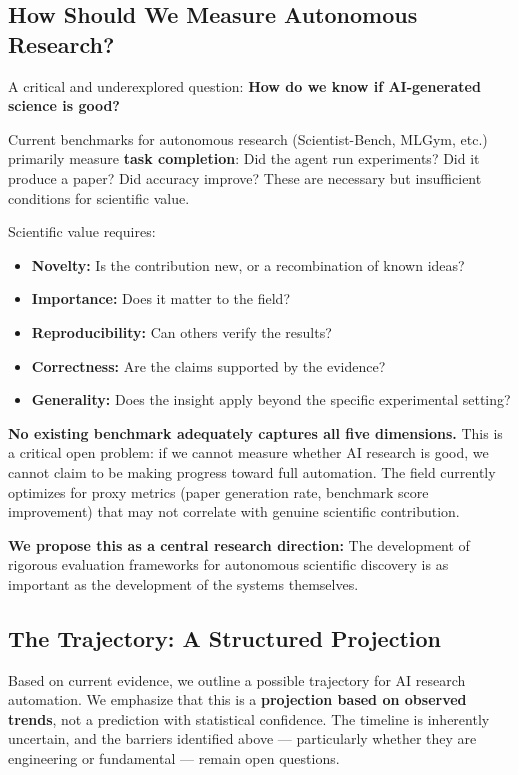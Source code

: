 \documentclass[11pt,a4paper]{article}
\begin{document}
\subsection{How Should We Measure Autonomous Research?}

A critical and underexplored question: \textbf{How do we know if AI-generated science is good?}

Current benchmarks for autonomous research (Scientist-Bench, MLGym, etc.) primarily measure \textbf{task completion}: Did the agent run experiments? Did it produce a paper? Did accuracy improve? These are necessary but insufficient conditions for scientific value.

Scientific value requires:
\begin{itemize}[leftmargin=2em]
    \item \textbf{Novelty:} Is the contribution new, or a recombination of known ideas?
    \item \textbf{Importance:} Does it matter to the field?
    \item \textbf{Reproducibility:} Can others verify the results?
    \item \textbf{Correctness:} Are the claims supported by the evidence?
    \item \textbf{Generality:} Does the insight apply beyond the specific experimental setting?
\end{itemize}

\textbf{No existing benchmark adequately captures all five dimensions.} This is a critical open problem: if we cannot measure whether AI research is good, we cannot claim to be making progress toward full automation. The field currently optimizes for proxy metrics (paper generation rate, benchmark score improvement) that may not correlate with genuine scientific contribution.

\textbf{We propose this as a central research direction:} The development of rigorous evaluation frameworks for autonomous scientific discovery is as important as the development of the systems themselves.

\subsection{The Trajectory: A Structured Projection}

Based on current evidence, we outline a possible trajectory for AI research automation. We emphasize that this is a \textbf{projection based on observed trends}, not a prediction with statistical confidence. The timeline is inherently uncertain, and the barriers identified above --- particularly whether they are engineering or fundamental --- remain open questions.
\end{document}
